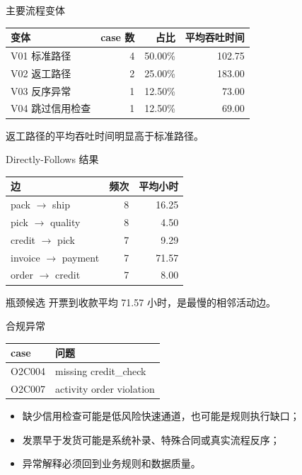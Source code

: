 \documentclass[UTF8,fontset=fandol,aspectratio=169,11pt]{ctexbeamer}
\begin{document}
\begin{frame}{主要流程变体}
\begin{center}
\begin{tabular}{lrrr}
\toprule
变体 & case 数 & 占比 & 平均吞吐时间\\
\midrule
V01 标准路径 & 4 & 50.00\% & 102.75\\
V02 返工路径 & 2 & 25.00\% & 183.00\\
V03 反序异常 & 1 & 12.50\% & 73.00\\
V04 跳过信用检查 & 1 & 12.50\% & 69.00\\
\bottomrule
\end{tabular}
\end{center}
\small
返工路径的平均吞吐时间明显高于标准路径。
\end{frame}

\begin{frame}{Directly-Follows 结果}
\begin{center}
\begin{tabular}{lrr}
\toprule
边 & 频次 & 平均小时\\
\midrule
pack \(\rightarrow\) ship & 8 & 16.25\\
pick \(\rightarrow\) quality & 8 & 4.50\\
credit \(\rightarrow\) pick & 7 & 9.29\\
invoice \(\rightarrow\) payment & 7 & 71.57\\
order \(\rightarrow\) credit & 7 & 8.00\\
\bottomrule
\end{tabular}
\end{center}
\begin{block}{瓶颈候选}
开票到收款平均 71.57 小时，是最慢的相邻活动边。
\end{block}
\end{frame}

\begin{frame}{合规异常}
\begin{center}
\begin{tabular}{ll}
\toprule
case & 问题\\
\midrule
O2C004 & missing credit\_check\\
O2C007 & activity order violation\\
\bottomrule
\end{tabular}
\end{center}
\begin{itemize}
  \item 缺少信用检查可能是低风险快速通道，也可能是规则执行缺口；
  \item 发票早于发货可能是系统补录、特殊合同或真实流程反序；
  \item 异常解释必须回到业务规则和数据质量。
\end{itemize}
\end{frame}
\end{document}
